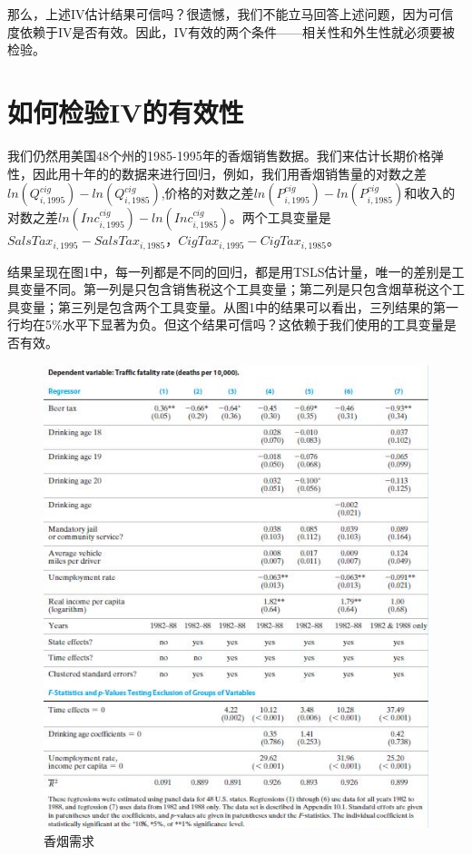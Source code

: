 \documentclass[cn,10pt,math=newtx,citestyle=gb7714-2015,bibstyle=gb7714-2015]{elegantbook}
\begin{document}
	那么，上述IV估计结果可信吗？很遗憾，我们不能立马回答上述问题，因为可信度依赖于IV是否有效。因此，IV有效的两个条件——相关性和外生性就必须要被检验。
	
	\section{如何检验IV的有效性}
	
	我们仍然用美国48个州的1985-1995年的香烟销售数据。我们来估计长期价格弹性，因此用十年的的数据来进行回归，例如，我们用香烟销售量的对数之差$ln(Q_{i,1995}^{cig})-ln(Q_{i,1985}^{cig})$,价格的对数之差$ln(P_{i,1995}^{cig})-ln(P_{i,1985}^{cig})$和收入的对数之差$ln(Inc_{i,1995}^{cig})-ln(Inc_{i,1985}^{cig})$。两个工具变量是$SalsTax_{i,1995}-SalsTax_{i,1985}$，$CigTax_{i,1995}-CigTax_{i,1985}$。
	
	结果呈现在图1中，每一列都是不同的回归，都是用TSLS估计量，唯一的差别是工具变量不同。第一列是只包含销售税这个工具变量；第二列是只包含烟草税这个工具变量；第三列是包含两个工具变量。从图1中的结果可以看出，三列结果的第一行均在5\%水平下显著为负。但这个结果可信吗？这依赖于我们使用的工具变量是否有效。
	
	
	\begin{figure}[htbp]
		\centering
		\includegraphics[width=1\textwidth]{results.jpg}
		\caption{香烟需求}\label{fig:digit}
	\end{figure}
	
\end{document}
